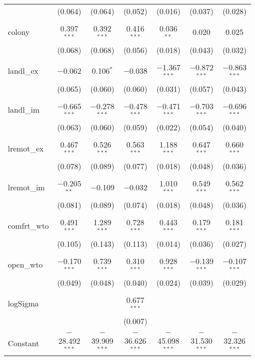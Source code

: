 \documentclass[12pt]{article}
\begin{document}
\begin{table}[!htbp]
\begin{tabular}{@{\extracolsep{5pt}}lcccccc}
  & (0.064) & (0.064) & (0.052) & (0.016) & (0.037) & (0.028) \\ 
  & & & & & & \\ 
 colony & 0.397$^{***}$ & 0.392$^{***}$ & 0.416$^{***}$ & 0.036$^{**}$ & 0.020 & 0.025 \\ 
  & (0.068) & (0.068) & (0.056) & (0.018) & (0.043) & (0.032) \\ 
  & & & & & & \\ 
 landl\_ex & $-$0.062 & 0.106$^{*}$ & $-$0.038 & $-$1.367$^{***}$ & $-$0.872$^{***}$ & $-$0.863$^{***}$ \\ 
  & (0.065) & (0.060) & (0.060) & (0.031) & (0.057) & (0.043) \\ 
  & & & & & & \\ 
 landl\_im & $-$0.665$^{***}$ & $-$0.278$^{***}$ & $-$0.478$^{***}$ & $-$0.471$^{***}$ & $-$0.703$^{***}$ & $-$0.696$^{***}$ \\ 
  & (0.063) & (0.060) & (0.059) & (0.022) & (0.054) & (0.040) \\ 
  & & & & & & \\ 
 lremot\_ex & 0.467$^{***}$ & 0.526$^{***}$ & 0.563$^{***}$ & 1.188$^{***}$ & 0.647$^{***}$ & 0.660$^{***}$ \\ 
  & (0.078) & (0.089) & (0.077) & (0.018) & (0.048) & (0.036) \\ 
  & & & & & & \\ 
 lremot\_im & $-$0.205$^{**}$ & $-$0.109 & $-$0.032 & 1.010$^{***}$ & 0.549$^{***}$ & 0.562$^{***}$ \\ 
  & (0.081) & (0.089) & (0.074) & (0.018) & (0.048) & (0.036) \\ 
  & & & & & & \\ 
 comfrt\_wto & 0.491$^{***}$ & 1.289$^{***}$ & 0.728$^{***}$ & 0.443$^{***}$ & 0.179$^{***}$ & 0.181$^{***}$ \\ 
  & (0.105) & (0.143) & (0.113) & (0.014) & (0.036) & (0.027) \\ 
  & & & & & & \\ 
 open\_wto & $-$0.170$^{***}$ & 0.739$^{***}$ & 0.310$^{***}$ & 0.928$^{***}$ & $-$0.139$^{***}$ & $-$0.107$^{***}$ \\ 
  & (0.049) & (0.048) & (0.040) & (0.024) & (0.039) & (0.029) \\ 
  & & & & & & \\ 
 logSigma &  &  & 0.677$^{***}$ &  &  &  \\ 
  &  &  & (0.007) &  &  &  \\ 
  & & & & & & \\ 
 Constant & $-$28.492$^{***}$ & $-$39.909$^{***}$ & $-$36.626$^{***}$ & $-$45.098$^{***}$ & $-$31.530$^{***}$ & $-$32.326$^{***}$ \\ 

\end{tabular}
\end{table}
\end{document}
